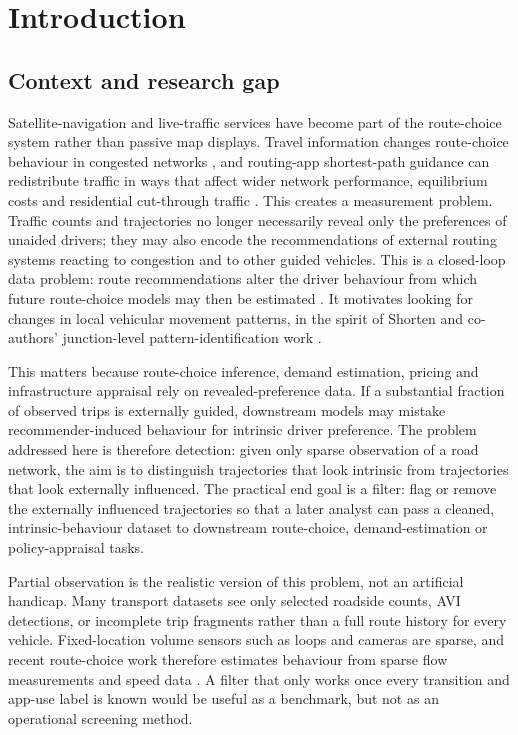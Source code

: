 \section{Introduction}\label{sec:introduction}

\subsection{Context and research gap}
\label{sec:context}\label{sec:background}

Satellite-navigation and live-traffic services have become part of the
route-choice system rather than passive map displays. Travel information
changes route-choice behaviour in congested networks
\cite{yang2001atis,ramos2020information}, and routing-app shortest-path
guidance can redistribute traffic in ways that affect wider network
performance, equilibrium costs and residential cut-through traffic
\cite{acemoglu2018informational,cabannes2018gps,krichene2018}. This
creates a measurement problem. Traffic counts and trajectories no longer
necessarily reveal only the preferences of unaided drivers; they may also
encode the recommendations of external routing systems reacting to
congestion and to other guided vehicles. This is a closed-loop data
problem: route recommendations alter the driver behaviour from which
future route-choice models may then be estimated
\cite{epperlein2019recovering}. It motivates looking for changes in local
vehicular movement patterns, in the spirit of Shorten and co-authors'
junction-level pattern-identification work \cite{gu2018}.

This matters because route-choice inference, demand estimation, pricing
and infrastructure appraisal rely on revealed-preference data. If a
substantial fraction of observed trips is externally guided, downstream
models may mistake recommender-induced behaviour for intrinsic driver
preference. The problem addressed here is therefore detection: given only
sparse observation of a road network, the aim is to distinguish
trajectories that look intrinsic from trajectories that look externally
influenced. The practical end goal is a filter: flag or remove the
externally influenced trajectories so that a later analyst can pass a
cleaned, intrinsic-behaviour dataset to downstream route-choice,
demand-estimation or policy-appraisal tasks.

Partial observation is the realistic version of this problem, not an
artificial handicap. Many transport datasets see only selected roadside
counts, AVI detections, or incomplete trip fragments rather than a full
route history for every vehicle. Fixed-location volume sensors such as
loops and cameras are sparse, and recent route-choice work therefore
estimates behaviour from sparse flow measurements and speed data
\cite{kurzhanskiy2022sparse}. A filter that only works once every
transition and app-use label is known would be useful as a benchmark, but
not as an operational screening method.

